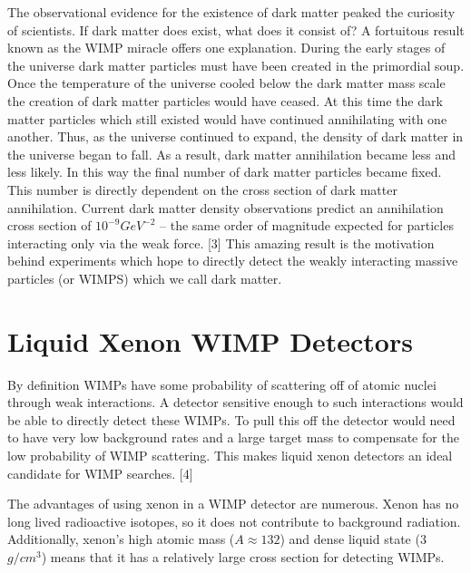 \documentclass[a4paper,12pt]{article}
\begin{document}
The observational evidence for the existence of dark matter peaked the curiosity of scientists.  If dark matter does exist, what does it consist of? A fortuitous result known as the WIMP miracle offers one explanation.  During the early stages of the universe dark matter particles must have been created in the primordial soup.  Once the temperature of the universe cooled below the dark matter mass scale the creation of dark matter particles would have ceased.  At this time the dark matter particles which still existed would have continued annihilating with one another.  Thus, as the universe continued to expand, the density of dark matter in the universe began to fall.  As a result, dark matter annihilation became less and less likely.  In this way the final number of dark matter particles became fixed.  This number is directly dependent on the cross section of dark matter annihilation.  Current dark matter density observations predict an annihilation cross section of $ 10^{-9} GeV^{-2} $ -- the same order of magnitude expected for particles interacting only via the weak force. [3] This amazing result is the motivation behind experiments which hope to directly detect the weakly interacting massive particles (or WIMPS) which we call dark matter. 

\section{Liquid Xenon WIMP Detectors}

By definition WIMPs have some probability of scattering off of atomic nuclei through weak interactions.  A detector sensitive enough to such interactions would be able to directly detect these WIMPs.  To pull this off the detector would need to have very low background rates and a large target mass to compensate for the low probability of WIMP scattering.  This makes liquid xenon detectors an ideal candidate for WIMP searches. [4]

The advantages of using xenon in a WIMP detector are numerous.  Xenon has no long lived radioactive isotopes, so it does not contribute to background radiation.  Additionally, xenon's high atomic mass  ($ A \approx 132 $) and dense liquid state (3 $ g/cm^3 $) means that it has a relatively large cross section for detecting WIMPs.
\end{document}
